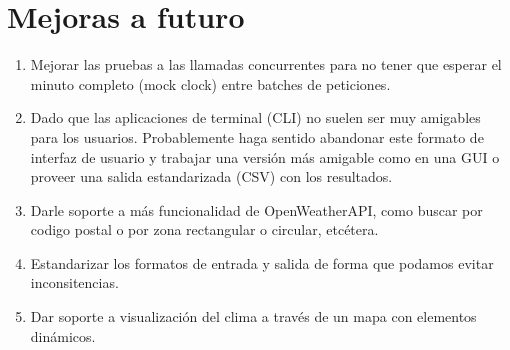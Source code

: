 \documentclass[10pt, letterpaper]{article}
\begin{document}
\section{Mejoras a futuro}
\begin{enumerate}
    \item Mejorar las pruebas a las llamadas concurrentes para no tener que esperar el minuto completo (mock clock) entre batches de peticiones.
    \item Dado que las aplicaciones de terminal (CLI) no suelen ser muy amigables para los usuarios. Probablemente haga sentido abandonar este formato de interfaz de usuario y trabajar una versión más amigable como en una GUI o proveer una salida estandarizada (CSV) con los resultados. 
    \item Darle soporte a más funcionalidad de OpenWeatherAPI, como buscar por codigo postal o por zona rectangular o circular, etcétera.
    \item Estandarizar los formatos de entrada y salida de forma que podamos evitar inconsitencias.
    \item Dar soporte a visualización del clima a través de un mapa con elementos dinámicos.
\end{enumerate}
\end{document}
